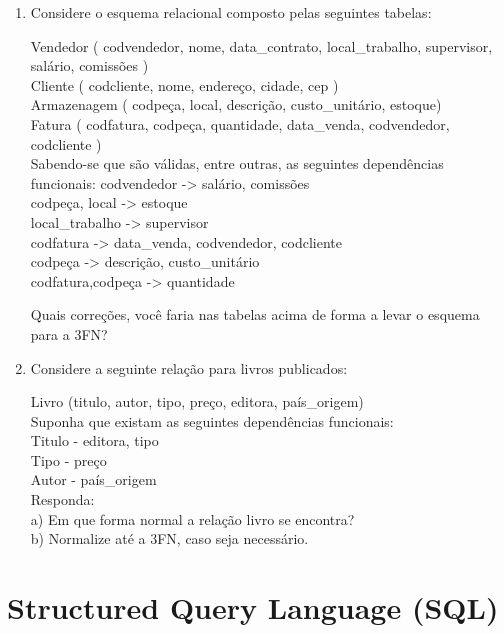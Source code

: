 \documentclass[11pt]{article}
\begin{document}
\begin{enumerate}
		\item Considere o esquema relacional composto pelas seguintes tabelas:
		
		Vendedor ( codvendedor, nome, data\_contrato, local\_trabalho, supervisor, salário, comissões )\\
		Cliente ( codcliente, nome, endereço, cidade, cep )\\
		Armazenagem ( codpeça, local, descrição, custo\_unitário, estoque)\\
		Fatura ( codfatura, codpeça, quantidade, data\_venda, codvendedor, codcliente )\\
		
		Sabendo-se que são válidas, entre outras, as seguintes dependências funcionais:
		codvendedor -> salário, comissões\\
		codpeça, local -> estoque\\
		local\_trabalho -> supervisor\\
		codfatura -> data\_venda, codvendedor, codcliente\\
		codpeça -> descrição, custo\_unitário\\
		codfatura,codpeça -> quantidade 
		
		Quais correções, você faria nas tabelas acima de forma a levar o esquema para a 3FN?
		
		\item Considere a seguinte relação para livros publicados:
		
		Livro (titulo, autor, tipo, preço, editora, país\_origem)\\
		Suponha que existam as seguintes dependências funcionais:\\
		Titulo - editora, tipo\\
		Tipo - preço\\
		Autor - país\_origem\\
		
		Responda:\\
		a) Em que forma normal a relação livro se encontra?\\
		b) Normalize até a 3FN, caso seja necessário.  
	\end{enumerate}
	
	\newpage
	
	\section{Structured Query Language (SQL)}
	
\end{document}

